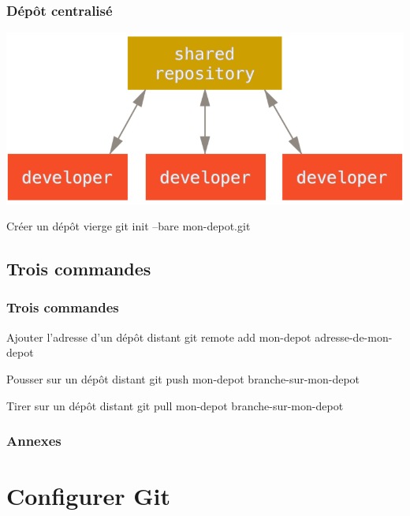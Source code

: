 \documentclass[t,11pt]{beamer}
\begin{document}
\begin{frame}
        \frametitle{D\'ep\^ot centralis\'e}
        \centering
        \includegraphics[width=\linewidth,height=0.8\textheight,keepaspectratio]{./img/centralized_workflow}
        \begin{block}{Cr\'eer un d\'ep\^ot vierge}
                git init --bare mon-depot.git
        \end{block}
\end{frame}

\subsection{Trois commandes}

\begin{frame}
        \frametitle{Trois commandes}
        \begin{block}{Ajouter l'adresse d'un d\'ep\^ot distant}
                git remote add mon-depot adresse-de-mon-depot
        \end{block}
        \begin{block}{Pousser sur un d\'ep\^ot distant}
                git push mon-depot branche-sur-mon-depot
        \end{block}
        \begin{block}{Tirer sur un d\'ep\^ot distant}
                git pull mon-depot branche-sur-mon-depot
        \end{block}
\end{frame}

\appendix
\begin{frame}[c]
        \frametitle{Annexes}
        \tableofcontents[hideallsubsections]
\end{frame}

\section{Configurer Git}
\end{document}
